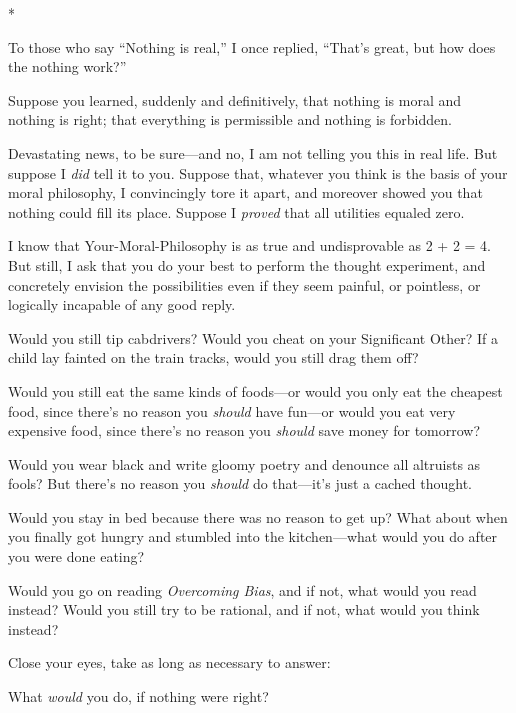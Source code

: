 {\centering
 *
\par}


{
 To those who say ``Nothing is
real,'' I once replied,
``That's great, but how does the
nothing work?'' }

{
 Suppose you learned, suddenly and definitively, that nothing is
moral and nothing is right; that everything is permissible and nothing
is forbidden.}

{
 Devastating news, to be sure---and no, I am not telling you this
in real life. But suppose I \textit{did} tell it to you. Suppose that,
whatever you think is the basis of your moral philosophy, I
convincingly tore it apart, and moreover showed you that nothing could
fill its place. Suppose I \textit{proved} that all utilities equaled
zero.}

{
 I know that Your-Moral-Philosophy is as true and undisprovable as
2 + 2 = 4. But still, I ask that you do your best to perform the
thought experiment, and concretely envision the possibilities even if
they seem painful, or pointless, or logically incapable of any good
reply.}

{
 Would you still tip cabdrivers? Would you cheat on your
Significant Other? If a child lay fainted on the train tracks, would
you still drag them off?}

{
 Would you still eat the same kinds of foods---or would you only
eat the cheapest food, since there's no reason you
\textit{should} have fun---or would you eat very expensive food, since
there's no reason you \textit{should} save money for
tomorrow?}

{
 Would you wear black and write gloomy poetry and denounce all
altruists as fools? But there's no reason you
\textit{should} do that---it's just a cached thought.}

{
 Would you stay in bed because there was no reason to get up? What
about when you finally got hungry and stumbled into the kitchen---what
would you do after you were done eating?}

{
 Would you go on reading \textit{Overcoming Bias}, and if not, what
would you read instead? Would you still try to be rational, and if not,
what would you think instead?}

{
 Close your eyes, take as long as necessary to answer:}

{
 What \textit{would} you do, if nothing were right?}

{\centering
 \ ~
\par}


